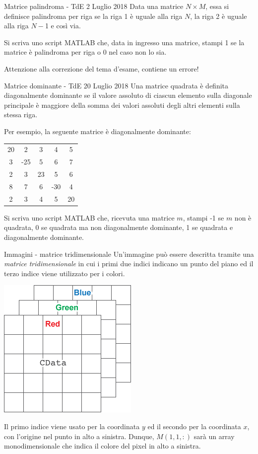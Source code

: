 \documentclass[aspectratio=169, handout]{beamer}
\begin{document}
\begin{frame}{Matrice palindroma - TdE 2 Luglio 2018}
Data una matrice $N \times M$, essa si definisce palindroma per riga se la riga 1 è uguale alla riga $N$, la riga 2 è uguale alla riga $N-­$1 e così via.

Si scriva uno script MATLAB che, data in ingresso una matrice, stampi 1 se la matrice è palindroma per riga o 0 nel caso non lo sia.

Attenzione alla correzione del tema d'esame, contiene un errore!
\end{frame}

\begin{frame}{Matrice dominante - TdE 20 Luglio 2018}
Una matrice quadrata è definita diagonalmente dominante se il valore assoluto di ciascun elemento sulla
diagonale principale è maggiore della somma dei valori assoluti degli altri elementi sulla stessa riga.

Per esempio, la seguente matrice è diagonalmente dominante:
\begin{tabular}{ccccc}
	20 & 2 & 3 & 4 & 5 \\
	3 & -25 & 5 & 6 & 7 \\
	2 & 3 & 23 & 5 & 6 \\
	8 & 7 & 6 & -30 & 4 \\
	2 & 3 & 4 & 5 & 20 \\
\end{tabular}

Si scriva uno script MATLAB che, ricevuta una matrice $m$, stampi -1 se $m$ non è quadrata, 0 se quadrata ma non diagonalmente dominante, 1 se quadrata e diagonalmente dominante.
\end{frame}

\begin{frame}{Immagini - matrice tridimensionale}
Un'immagine può essere descritta tramite una \emph{matrice tridimensionale} in cui i primi due indici indicano un punto del piano ed il terzo indice viene utilizzato per i colori.

\begin{center}
\includegraphics[width=0.2\linewidth]{./matrice_immagine.png}
\end{center}

Il primo indice viene usato per la coordinata $y$ ed il secondo per la coordinata $x$, con l'origine nel punto in alto a sinistra.
Dunque, $M(1,1,:)$ sarà un array monodimensionale che indica il colore del pixel in alto a sinistra.
\end{frame}
\end{document}
